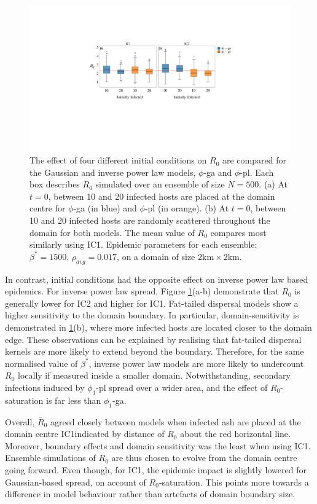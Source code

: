 \begin{figure}
    \centering
    \includegraphics[scale=0.475]{chapter6/figures/fig5-IC.pdf}
    \caption{
    The effect of four different initial conditions on $R_0$ are compared for the Gaussian and inverse power law models, $\phi$-ga and $\phi$-pl.
    Each box describes $R_0$ simulated over an ensemble of size $N=500$. 
    (a) At $t=0$, between 10 and 20 infected hosts are placed at the domain centre for $\phi$-ga (in blue) and $\phi$-pl (in orange).
    (b) At $t=0$, between 10 and 20 infected hosts are randomly scattered throughout the domain for both models.
    The mean value of $R_0$ compares most similarly using IC1.
    Epidemic parameters for each ensemble: $\beta^*=1500$, $\rho_{avg}=0.017$, on a domain of size $\mathrm{2km\times 2km}$.
  }
    \label{fig:seir-ash-IC}
\end{figure}

In contrast, initial conditions had the opposite effect on inverse power law based epidemics.
For inverse power law spread, Figure \ref{fig:seir-ash-IC}(a-b) demonstrate that $R_0$ is generally lower for IC2 and higher for IC1.
Fat-tailed dispersal models show a higher sensitivity to the domain boundary.
In particular, domain-sensitivity is demonstrated in \ref{fig:seir-ash-IC}(b), where more infected hosts are located closer to the domain edge.
These observations can be explained by realising that fat-tailed dispersal kernels are more likely to extend beyond the boundary.
Therefore, for the same normalised value of $\beta^*$, inverse power law models are more likely to undercount $R_0$ locally if measured inside a smaller domain.
Notwithstanding, secondary infections induced by $\phi_1$-pl spread over a wider area, and the effect of $R_0$-saturation is far less than $\phi_1$-ga.

Overall, $\overline{R}_0$ agreed closely between models when infected ash are placed at the domain centre IC1\textemdash indicated by distance of $\overline{R}_0$ about the red horizontal line.
Moreover, boundary effects and domain sensitivity was the least when using IC1.
Ensemble simulations of $R_0$ are thus chosen to evolve from the domain centre going forward.
Even though, for IC1, the epidemic impact is slightly lowered for Gaussian-based spread, on account of $R_0$-saturation.
This points more towards a difference in model behaviour rather than artefacts of domain boundary size.


